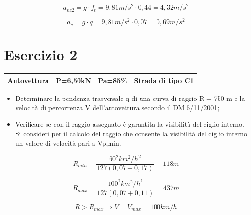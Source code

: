 \documentclass[
a4paper,
12pt, 
twoside]{scrbook}
\begin{document}
{{{{{{{   	\begin{equation}
   		a_{nc2}=g\cdot f_t=9,81m/s^2\cdot 0,44=4,32m/s^2
   	\end{equation}
   	
   	\begin{equation}
   		a_c=g\cdot q=9,81m/s^2\cdot 0,07=0,69m/s^2
   	\end{equation}
   	
   	\section{Esercizio 2}
    	
    \leavevmode\newline
    {
    	\centering
    	\begin{tabular}{|c|c|c|c|}
    		\hline
    		\rule[-1ex]{0pt}{2.5ex}  Autovettura & P=6,50kN & Pa=85\% & Strada di tipo C1 \\
    		\hline
    	\end{tabular}\par
    }
   \leavevmode\newline
   \begin{boxK}
   	\begin{itemize}
   		\item Determinare la pendenza trasversale q di una curva di raggio R = 750 m e la velocità di percorrenza V dell'autovettura secondo il DM 5/11/2001;  
   		\item Verificare se con il raggio assegnato è garantita la visibilità del ciglio interno. Si consideri per il calcolo del raggio che consente la visibilità del ciglio interno un valore di velocità pari a Vp,min. 
   	\end{itemize}
   \end{boxK}  
   
   \begin{equation}
   	R_{min}=\frac{60^2km^2/h^2}{127(0,07+0,17)}=118m
   \end{equation}
   
   \begin{equation}
   	R_{max}=\frac{100^2km^2/h^2}{127(0,07+0,11)}=437m
   \end{equation} 	
   
   \begin{equation}
   	R>R_{max}\Rightarrow V=V_{max}=100km/h
   \end{equation} 	
   
   {
   	\centering
   
}}}}}}}}
\end{document}

